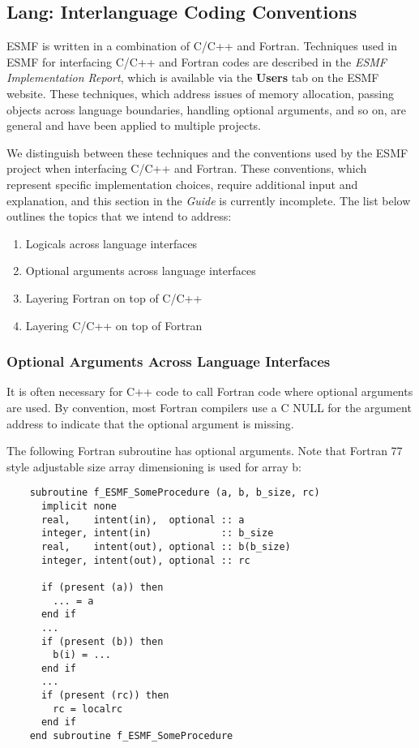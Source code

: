 
\subsection{Lang: Interlanguage Coding Conventions}

ESMF is written in a combination of C/C++ and Fortran.
Techniques used in ESMF for interfacing C/C++ and Fortran codes
are described in the {\it ESMF Implementation Report}\cite{bib:ESMFimplrep},
which is available via the {\bf Users} tab on the ESMF website.  These
techniques, which address issues of memory allocation, passing
objects across language boundaries, handling optional arguments,
and so on, are general and have been applied to multiple projects.  

We distinguish between these techniques and the conventions used
by the ESMF project when interfacing C/C++ and Fortran.  These
conventions, which represent specific implementation choices,
require additional input and explanation, and this section in 
the {\it Guide} is currently incomplete.  The list below outlines
the topics that we intend to address:

\begin{enumerate}
\item Logicals across language interfaces
\item Optional arguments across language interfaces
\item Layering Fortran on top of C/C++
\item Layering C/C++ on top of Fortran
\end{enumerate}


\subsubsection{Optional Arguments Across Language Interfaces}

It is often necessary for C++ code to call Fortran code where optional arguments are
used.  By convention, most Fortran compilers use a C NULL for the argument address
to indicate that the optional argument is missing.

The following Fortran subroutine has optional arguments.  Note that Fortran 77 style
adjustable size array dimensioning is used for array b:

\begin{verbatim}
    subroutine f_ESMF_SomeProcedure (a, b, b_size, rc)
      implicit none
      real,    intent(in),  optional :: a
      integer, intent(in)            :: b_size
      real,    intent(out), optional :: b(b_size)
      integer, intent(out), optional :: rc

      if (present (a)) then
        ... = a
      end if
      ...
      if (present (b)) then
        b(i) = ...
      end if
      ...
      if (present (rc)) then
        rc = localrc
      end if
    end subroutine f_ESMF_SomeProcedure
\end{verbatim}

